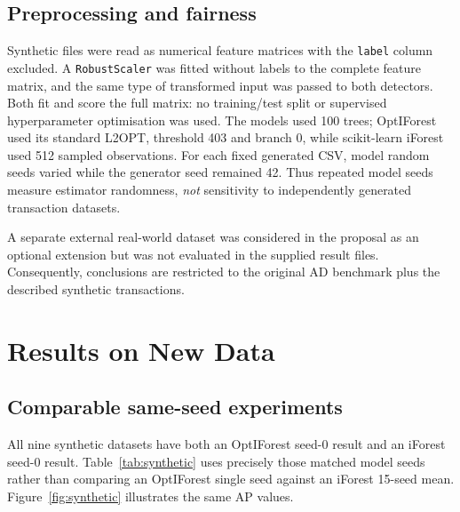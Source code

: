 \documentclass[11pt]{article}
\begin{document}
\subsection{Preprocessing and fairness}
Synthetic files were read as numerical feature matrices with the \texttt{label} column excluded. A \texttt{RobustScaler} was fitted without labels to the complete feature matrix, and the same type of transformed input was passed to both detectors. Both fit and score the full matrix: no training/test split or supervised hyperparameter optimisation was used. The models used 100 trees; OptIForest used its standard L2OPT, threshold 403 and branch 0, while scikit-learn iForest used 512 sampled observations. For each fixed generated CSV, model random seeds varied while the generator seed remained 42. Thus repeated model seeds measure estimator randomness, \emph{not} sensitivity to independently generated transaction datasets.
 
A separate external real-world dataset was considered in the proposal as an optional extension but was not evaluated in the supplied result files. Consequently, conclusions are restricted to the original AD benchmark plus the described synthetic transactions.
 
\section{Results on New Data}
\subsection{Comparable same-seed experiments}
All nine synthetic datasets have both an OptIForest seed-0 result and an iForest seed-0 result. Table~\ref{tab:synthetic} uses precisely those matched model seeds rather than comparing an OptIForest single seed against an iForest 15-seed mean. Figure~\ref{fig:synthetic} illustrates the same AP values.
 
\end{document}
